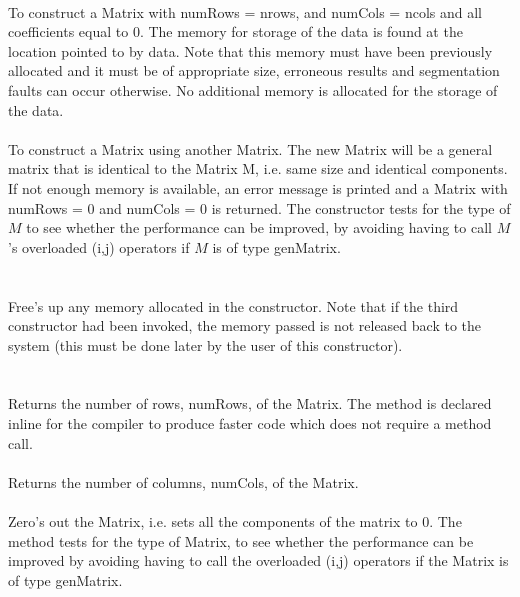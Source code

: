   \\
To construct a Matrix with numRows = \p nrows, and numCols =
\p ncols and all coefficients equal to $0$. The memory for storage
of the data is found at the location pointed to by \p data. Note
that this memory must have been previously allocated and it must be of
appropriate size, erroneous results and segmentation faults can occur
otherwise. No additional memory is allocated for the storage of the
data. \\ 

  \\
To construct a Matrix using another Matrix. The new Matrix will be a
general matrix that is identical to the Matrix \p M, i.e. same size
and identical components. If not enough memory is available, an error
message is printed and a Matrix with numRows = $0$ and numCols = $0$
is returned. The constructor tests for the type of $M$ to see whether
the performance can be improved, by avoiding having to call $M$'s
overloaded (i,j) operators if $M$ is of type genMatrix. \\ 

 \\
 \\ 
Free's up any memory allocated in the constructor. Note that if the
third constructor had been invoked, the memory passed is not released
back to the system (this must be done later by the user of this
constructor). \\

  \\
 \\
Returns the number of rows, numRows, of the Matrix. The method is
declared inline for the compiler to produce faster code which does not
require a method call. \\

 \\
Returns the number of columns, numCols, of the Matrix. \\

 \\
Zero's out the Matrix, i.e. sets all the components of the matrix to
$0$. The method tests for the type of Matrix, to see whether the
performance can be improved by avoiding having to call the overloaded
(i,j) operators if the Matrix is of type genMatrix. \\ 

